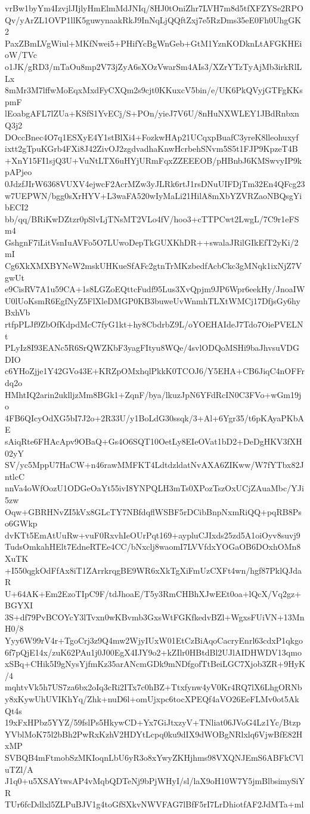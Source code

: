 vrBw1byYm4IzvjlJIjlyHmElmMdJNIq/8HJ0tOniZhr7LVH7m8d5tfXFZYSe2RPO
Qv/yArZL1OVP1llK5guwynaakRkJ9InNqLjQQftZxj7e5RzDms35eE0Fh0UhgGK2
PaxZBmLVgWiul+MKfNwei5+PHifYcBgWnGeb+GtM1YznKODknLtAFGKHEioW/TVc
o1JK/gRD3/mTaOu8mp2V73jZyA6sXOzVwarSm4AIs3/XZrYTzTyAjMb3irkRlLLx
8mMr3M7lffwMoEqxMxdFyCXQm2s9cjt0KKuxcV5bin/e/UK6PkQVyjGTFgKKspmF
lEoabgAFL7lZUa+KSfS1YvECj/S+POn/yieJ7V6U/8nHuNXWLEY1JBdRnbxnQ3j2
DOccBnec4O7q1ESXyE4Y1stBlXi4+FozkwHAp21UCqxpBuafC3yreK8lleohuxyf
ixtt2gTpuKGrb4FXi8J42ZivOJ2zgdvadhaKnwHcrbehSNvm5S5t1FJP9KpzeT4B
+XnY15FI1sjQ3U+VuNtLTX6uHYjURmFqxZZEEEOB/pHBnbJ6KMSwvyIP9kpAPjeo
0JdzfJIrW6368VUXV4ejwcF2AcrMZw3yJLRk6rtJ1rsDNuUIFDjTm32En4QFcg23
w7UEPWN/bgg0sXrHYV+L3waFA520wIyMaLi21HilA8mXbYZVRZaoNBQsgYibECI2
bb/qq/BRiKwDZtzr0pSlvLjTNsMT2VLo4fV/hoo3+cTTPCwt2LwgL/7C9r1eFSm4
GshgnF7iLitVsnIuAVFo5O7LUwoDepTkGUXKhDR++swalaJRilGIkEfT2yKi/2mI
Cg6XkXMXBYNeW2mskUHKueSfAFc2gtnTrMKzbedfAcbCkc3gMNqk1ixNjZ7VgwUt
e9CisRV7A1u59CA+1s8LGZoEQttcFudf95Lus3XvQpjm9JP6Wpr6eekHy/JnoaIW
U0lUoKsmR6EgfNyZ5FlXleDMGP0KB3buweUvWnmhTLXtWMCj17DfjsGy6hyBxhVb
rtfpPLJf9ZbOfKdpdMcC7fyG1kt+hy8CbdrbZ9L/oYOEHAIdeJ7Tdo7OiePVELNt
PLyIz8I93EANc5R6SrQWZKbF3yagFItyu8WQe/4svlODQoMSHi9baJhvsuVDGDIO
c6YHoZjje1Y42GVo43E+KRZpOMxhqlPkkK0TCOJ6/Y5EHA+CB6JiqC4nOFFrdq2o
HMhtIQ2arin2uklljzMm8BGk1+ZqnF/bya/lkuzJpN6YFdRcIN0C3FVo+wGm19jo
4FB6QIcyOdXG5bI7J2o+2R33U/y1BoLdG30ssqk/3+Al+6Ygr35/t6pKAyaPKbAE
sAiqRte6FHAcApv9OBaQ+Gs4O6SQT10OetLy8EIeOVat1bD2+DeDgHKV3fXH02yY
SV/yc5MppU7HaCW+n46rawMMFKT4LdtdzldatNvAXA6ZIKww/W7fYTbx82JntlcC
nnVa4oWfOozU1ODGeOaYt55ivI8YNPQLH3mTs0XPozTszOxUCjZAuaMbc/YJi5zw
Oqw+GBRHNvZI5kVx8GLcTY7NBfdqflWSBF5rDCibBnpNxmRiQQ+pqRB8Pso6GWkp
dvKTt5EmAtUuRw+vuF0RxvhIeOUrPqt169+aypluCJIxds25zd5A1oiOyv8suvj9
TudsOmkahHElt7EdneRTEe4CC/bNxclj8waomI7LVVfdxYOGaOB6DOxhOMn8XuTK
+I550qgkOdFfAx8iT1ZArrkrqgBE9WR6xXkTgXiFmUzCXFt4wn/hgf87PklQJdaR
U+64AK+Em2EzoTIpC9F/tdJhoaE/T5y3RmCHBhXJwEEt0oa+lQcX/Vq2gz+BGYXI
3S+df79PvBCOYcY3lTvxn0wKBvmb3GxsWtFGKfkedvBZl+WgxsFUiVN+13MnH0/8
Yyy6W99rV4r+TgoCrj3z9Q4mw2WjyIUxW01EtCzBiAqoCacryEnrl63cdxP1qkgo
6f7pQjE14x/zuK62PAu1j0J00EgX4IJY9o2+kZIlr0HBtdBl2UJlAIDHWDV13qmo
xSBq+CHik5I9gNysYjfmKz35arANcmGDk9mNDfgofTtBeiLGC7Xjob3ZR+9HyK/4
mqhtvVk5h7US7za6bx2oIq3cRi2ITx7c0hBZ+Ttxfynw4yV0Kr4RQ7lX6LhgORNb
y8xKywUhUVIKhYq/Zhk+nuD6l+omUjxpc6tocXPEQf4aVO26EeFLMv0ot5AkQt4s
19xFxHPbz5YYZ/59fslPs5HkywCD+Yx7GiJtxzyV+TNliat06JVoG4Lz1Yc/Btzp
YVblMoK75l2bBh2PwRxKzhV2HDYtLcpq0ku9dIX9dWOBgNRlxlq6VjwBfE82HxMP
SVBQB4mFtmobSzMKIoqnLbU6yR3o8xYwyZKHjhms98VXQNJEmS6ABFkCVluTZl/A
J1q0+u5XSAYtwsAP4vMqbQDTeNj9bPjWHyI/sl/laX9oH10W7Y5jmBlbsimySiYR
TUr6fcDdlxl5ZLPuBJV1g4toGfSXkvNWVFAG7lBfF5rI7LrDhiotfAF2JdMTa+ml
